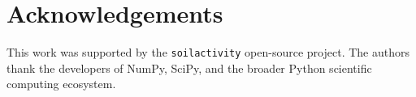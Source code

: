 \documentclass[a4paper,11pt]{article}
\begin{document}
\section*{Acknowledgements}

This work was supported by the \texttt{soilactivity} open-source
project.  The authors thank the developers of NumPy, SciPy, and
the broader Python scientific computing ecosystem.



\end{document}
